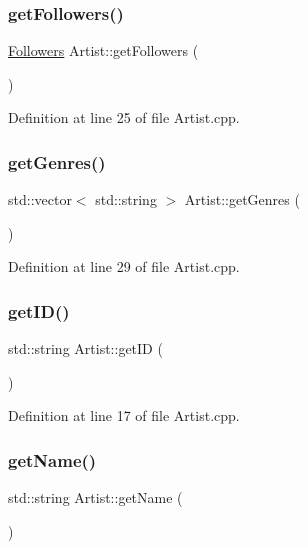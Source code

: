 \subsubsection{\texorpdfstring{get\+Followers()}{getFollowers()}}
{\footnotesize\ttfamily \mbox{\hyperlink{class_followers}{Followers}} Artist\+::get\+Followers (\begin{DoxyParamCaption}{ }\end{DoxyParamCaption})}



Definition at line 25 of file Artist.\+cpp.

\mbox{\label{class_artist_a7aa936126de112dd974e168ec746ffe5}} 
\subsubsection{\texorpdfstring{get\+Genres()}{getGenres()}}
{\footnotesize\ttfamily std\+::vector$<$ std\+::string $>$ Artist\+::get\+Genres (\begin{DoxyParamCaption}{ }\end{DoxyParamCaption})}



Definition at line 29 of file Artist.\+cpp.

\mbox{\label{class_artist_a6db9824940aa5cb2220e2bf527264af1}} 
\subsubsection{\texorpdfstring{get\+I\+D()}{getID()}}
{\footnotesize\ttfamily std\+::string Artist\+::get\+ID (\begin{DoxyParamCaption}{ }\end{DoxyParamCaption})}



Definition at line 17 of file Artist.\+cpp.

\mbox{\label{class_artist_a69924c70f35807ea4cd1208400a10c46}} 
\subsubsection{\texorpdfstring{get\+Name()}{getName()}}
{\footnotesize\ttfamily std\+::string Artist\+::get\+Name (\begin{DoxyParamCaption}{ }\end{DoxyParamCaption})}



